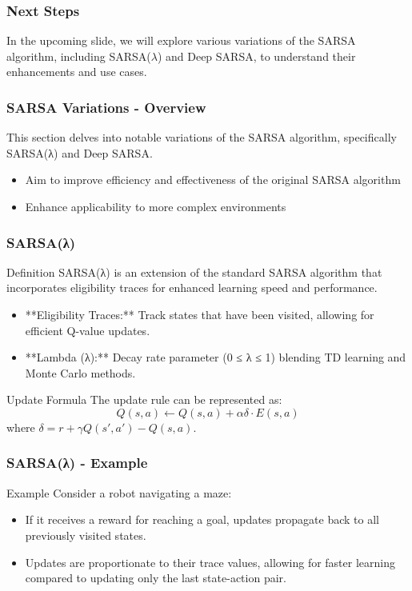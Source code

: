 \documentclass{beamer}
\begin{document}
\begin{frame}[fragile]
    \frametitle{Next Steps}
    In the upcoming slide, we will explore various variations of the SARSA algorithm, including SARSA($\lambda$) and Deep SARSA, to understand their enhancements and use cases.
\end{frame}

\begin{frame}[fragile]
    \frametitle{SARSA Variations - Overview}
    This section delves into notable variations of the SARSA algorithm, specifically SARSA(λ) and Deep SARSA. 
    \begin{itemize}
        \item Aim to improve efficiency and effectiveness of the original SARSA algorithm 
        \item Enhance applicability to more complex environments
    \end{itemize}
\end{frame}

\begin{frame}[fragile]
    \frametitle{SARSA(λ)}
    \begin{block}{Definition}
        SARSA(λ) is an extension of the standard SARSA algorithm that incorporates eligibility traces for enhanced learning speed and performance.
    \end{block}
    
    \begin{itemize}
        \item **Eligibility Traces:** Track states that have been visited, allowing for efficient Q-value updates.
        \item **Lambda (λ):** Decay rate parameter (0 ≤ λ ≤ 1) blending TD learning and Monte Carlo methods.
    \end{itemize}
    
    \begin{block}{Update Formula}
        The update rule can be represented as:
        \[
        Q(s, a) \leftarrow Q(s, a) + \alpha \delta \cdot E(s, a)
        \]
        where \( \delta = r + \gamma Q(s', a') - Q(s, a) \).
    \end{block}
\end{frame}

\begin{frame}[fragile]
    \frametitle{SARSA(λ) - Example}
    \begin{block}{Example}
        Consider a robot navigating a maze:
        \begin{itemize}
            \item If it receives a reward for reaching a goal, updates propagate back to all previously visited states.
            \item Updates are proportionate to their trace values, allowing for faster learning compared to updating only the last state-action pair.
        \end{itemize}
    \end{block}
\end{frame}
\end{document}
